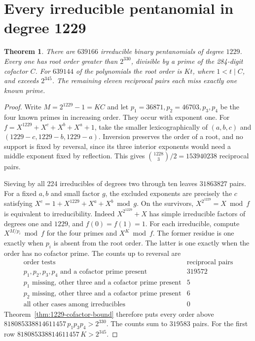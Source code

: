 \documentclass[11pt]{article}
\newtheorem{theorem}{Theorem}
\begin{document}
\section{Every irreducible pentanomial in degree 1229}
\begin{theorem}\label{thm:1229-all-orders}
There are \(639166\) irreducible binary pentanomials of degree \(1229\).
Every one has root order greater than \(2^{330}\), divisible by a
prime of the 284-digit cofactor \(C\). For \(639144\) of the polynomials
the root order is \(Kt\), where \(1<t\mid C\), and exceeds \(2^{345}\).
The remaining eleven reciprocal pairs each miss exactly one known
prime.
\end{theorem}
\begin{proof}
Write \(M=2^{1229}-1=KC\) and let \(p_1=36871,p_2=46703,p_3,p_4\)
be the four known primes in increasing order. They occur with
exponent one. For \(f=X^{1229}+X^c+X^b+X^a+1\), take the smaller
lexicographically of \((a,b,c)\) and \((1229-c,1229-b,1229-a)\).
Inversion preserves the order of a root, and no support is fixed by
reversal, since its three interior exponents would need a middle
exponent fixed by reflection. This gives
\(\binom{1228}{3}/2=153940238\) reciprocal pairs.

Sieving by all 224 irreducibles of degrees two through ten leaves
\(31863827\) pairs. For a fixed \(a,b\) and small factor \(g\), the
excluded exponents are precisely the \(c\) satisfying
\(X^c=1+X^{1229}+X^a+X^b\bmod g\).
On the survivors, \(X^{2^{1229}}=X\bmod f\) is equivalent to
irreducibility. Indeed \(X^{2^{1229}}+X\) has simple irreducible
factors of degrees one and \(1229\), and \(f(0)=f(1)=1\).
For each irreducible, compute \(X^{M/p_i}\bmod f\) for the four
primes and \(X^K\bmod f\). The former residue is one exactly when
\(p_i\) is absent from the root order. The latter is one exactly
when the order has no cofactor prime. The counts up to reversal are
\[
\begin{array}{l|r}
\text{order tests}&\text{reciprocal pairs}\\\hline
p_1,p_2,p_3,p_4\text{ and a cofactor prime present}&319572\\
p_1\text{ missing, other three and a cofactor prime present}&5\\
p_2\text{ missing, other three and a cofactor prime present}&6\\
\text{all other cases among irreducibles}&0
\end{array}
\]
Theorem~\ref{thm:1229-cofactor-bound} therefore puts every order
above \(818085338814611457\,p_1p_3p_4>2^{330}\).
The counts sum to \(319583\) pairs. For the first row
\(818085338814611457\,K>2^{345}\).


\end{proof}
\end{document}
